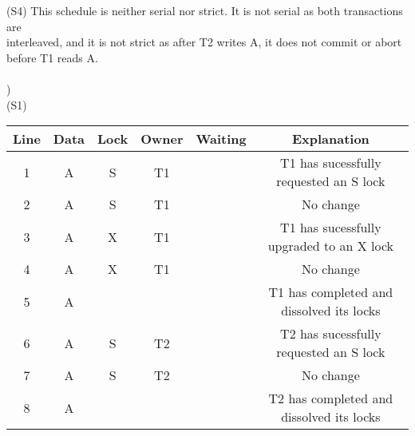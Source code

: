 \documentclass[12pt]{article}
\begin{document}
\indent (S4) This schedule is neither serial nor strict. It is not serial as both transactions are \\
\indent \indent interleaved, and it is not strict as after T2 writes A, it does not commit or abort \\
\indent \indent before T1 reads A.\\[-.4em]


\hrulefill\\


)\\
\indent(S1)\\[-1.5em]
\begin{table}[h!]
\centering
\begin{tabular}{c|c|c|c|c|c}
\bottomrule
\rowcolor{gray!50}
Line & Data & Lock & Owner & Waiting & Explanation\\\toprule
1 & A & S & T1 &   & T1 has sucessfully requested an S lock\\
2 & A & S & T1 &   & No change\\
3 & A & X & T1 &   & T1 has sucessfully upgraded to an X lock\\
4 & A & X & T1 &   & No change\\
5 & A &  &  &   & T1 has completed and dissolved its locks\\
6 & A & S & T2 &   & T2 has sucessfully requested an S lock\\
7 & A & S & T2 &   & No change\\
8 & A &  &  &   & T2 has completed and dissolved its locks\\\bottomrule
\end{tabular}
\end{table}\\
\end{document}
